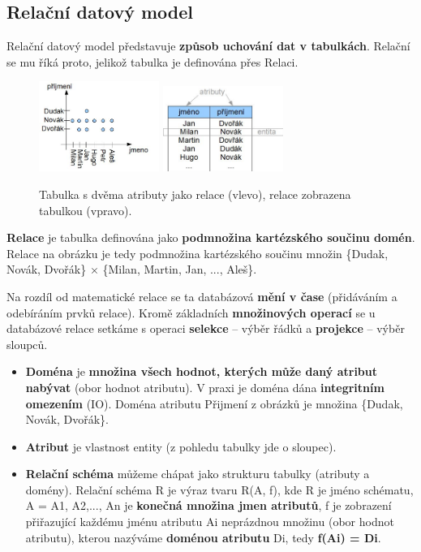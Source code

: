 \subsection{Relační datový model}
Relační datový model představuje \textbf{způsob uchování dat v tabulkách}. Relační se mu říká proto, jelikož tabulka je definována přes Relaci.

\begin{figure}[H]
	\centering
	\includegraphics[width=0.35\textwidth]{assets/tab_relace.png}
	\includegraphics[width=0.35\textwidth]{assets/relace.png}
	\caption{Tabulka s dvěma atributy jako relace (vlevo), relace zobrazena tabulkou (vpravo).}
\end{figure}

\textbf{Relace} je tabulka definována jako \textbf{podmnožina kartézského součinu domén}. Relace na obrázku je tedy podmnožina kartézského součinu množin \{Dudak, Novák, Dvořák\} $\times$ \{Milan, Martin, Jan, ..., Aleš\}.

Na rozdíl od matematické relace se ta databázová \textbf{mění v čase} (přidáváním a odebíráním prvků relace). Kromě základních \textbf{množinových operací} se u databázové relace setkáme s operaci \textbf{selekce} -- výběr řádků a \textbf{projekce} -- výběr sloupců.

\begin{itemize}
\item \textbf{Doména} je \textbf{množina všech hodnot, kterých může daný atribut nabývat} (obor hodnot atributu). V praxi je doména dána\textbf{ integritním omezením} (IO).
Doména atributu Přijmení z obrázků je množina \{Dudak, Novák, Dvořák\}.
\item \textbf{Atribut} je vlastnost entity (z pohledu tabulky jde o sloupec).
\item \textbf{Relační schéma} můžeme chápat jako strukturu tabulky (atributy a domény).
Relační schéma R je výraz tvaru R(A, f),  kde  R  je jméno schématu, A = {A1, A2,..., An} je \textbf{konečná množina jmen atributů}, f je zobrazení přiřazující každému jménu atributu Ai neprázdnou množinu (obor hodnot atributu), kterou nazýváme \textbf{doménou atributu} Di, tedy \textbf{f(Ai) = Di}.
\end{itemize}


